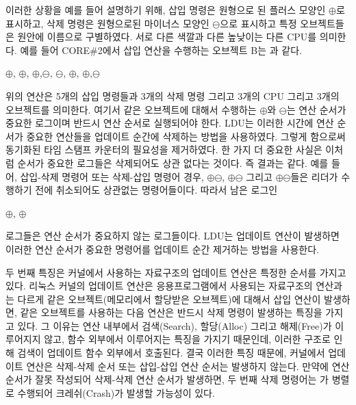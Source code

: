 이러한 상황을 예를 들어 설명하기 위해, 삽입 명령은 원형으로 된 플러스 모양인 $\oplus$로 표시하고, 
삭제 명령은 원형으로된 마이너스 모양인 $\ominus$으로 표시하고 
특정 오브젝트들은 원안에 이름으로 구별하였다.
서로 다른 색깔과 다른 높낮이는 다른 CPU를 의미한다. 
예를 들어 CORE\#2에서 삽입 연산을 수행하는 오브젝트 B는 과 같다.

\begin{center}
$\oplus$, $\oplus$, $\oplus$,$\ominus$,
$\ominus$, $\oplus$, $\oplus$,$\ominus$
\end{center}

위의 연산은 5개의 삽입 명령들과 3개의 삭제 명령 그리고 3개의 CPU 그리고 3개의 오브젝트를 의미한다.
여기서 같은 오브젝트에 대해서 수행하는 $\oplus$와 $\ominus$는 
연산 순서가 중요한 로그이며 반드시 연산 순서로 실행되어야 한다.  
LDU는 이러한 시간에 연산 순서가 중요한 연산들을 업데이트 순간에 삭제하는 방법을 사용하였다. 
그렇게 함으로써 동기화된 타임 스탬프 카운터의 필요성을 제거하였다. 
한 가지 더 중요한 사실은 이처럼 순서가 중요한 로그들은 삭제되어도 상관 없다는 것이다.
즉 결과는 같다.
예를 들어, 삽입-삭제 명령어 또는 삭제-삽입 명령어 경우,
$\oplus$$\ominus$, $\oplus$$\ominus$ 
그리고 $\oplus$$\ominus$들은 리더가 수행하기 전에 취소되어도 상관없는 명령어들이다. 
따라서 남은 로그인 
\begin{center}
 $\oplus$, $\oplus$
\end{center}
로그들은 연산 순서가 중요하지 않는 로그들이다.
LDU는 업데이트 연산이 발생하면 이러한 연산 순서가 중요한 명령어를 업데이트 순간 제거하는 방법을 
사용한다.

두 번째 특징은 커널에서 사용하는 자료구조의 업데이트 연산은 특정한 순서를 가지고 있다.
리눅스 커널의 업데이트 연산은 응용프로그램에서 사용되는 자료구조의 연산과는 다르게 
같은 오브젝트(메모리에서 할당받은 오브젝트)에 대해서 삽입 연산이 발생하면, 
같은 오브젝트를 사용하는 다음 연산은 반드시 삭제 명령이 발생하는 특징을 가지고 있다.
그 이유는 연산 내부에서 검색(Search), 할당(Alloc) 그리고 해제(Free)가 이루어지지 않고, 
함수 외부에서 이루어지는 특징을 가지기 때문인데, 이러한 구조로 인해 검색이 업데이트 함수 외부에서 
호출된다. 
결국 이러한 특징 때문에, 커널에서 업데이트 연산은 삭제-삭제 순서 또는 삽입-삽입 
연산 순서는 발생하지 않는다. 
만약에 연산 순서가 잘못 작성되어 삭제-삭제 연산 순서가 발생하면, 두 번째 삭제 명령어는 
가 병렬로 수행되어 크레쉬(Crash)가 발생할 가능성이 있다. 


